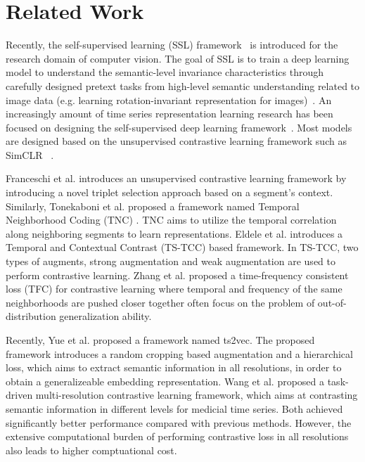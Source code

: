 \section{Related Work}
Recently, the self-supervised learning (SSL) framework~\cite{zhai2019s4l,misra2020self,hendrycks2019using,chen2020simple,he2020momentum,chen2020improved,grill2020bootstrap} is introduced for the research domain of computer vision. The goal of SSL is to train a deep learning model to understand the semantic-level invariance characteristics through carefully designed pretext tasks from  high-level semantic understanding related to image data (e.g. learning rotation-invariant representation for images)~\cite{zhai2019s4l,jang2018grasp2vec,gidaris2018unsupervised}. An increasingly amount of time series representation learning research has been focused on designing the self-supervised deep learning framework~\cite{yue2022ts2vec,franceschi2019unsupervised,tonekaboni2021unsupervised,eldele2021time}. Most models are designed based on the unsupervised contrastive learning framework such as SimCLR ~\cite{chen2020simple}. 

Franceschi et al.\cite{franceschi2019unsupervised} introduces an unsupervised contrastive learning framework by introducing a novel triplet selection approach based on a segment's context. Similarly, Tonekaboni et al. proposed a framework named Temporal Neighborhood Coding (TNC) \cite{tonekaboni2021unsupervised}. TNC aims to utilize the temporal correlation along neighboring segments to learn representations. Eldele et al. \cite{eldele2021time} introduces a Temporal and Contextual Contrast (TS-TCC) based framework.  In TS-TCC, two types of augments, strong augmentation and weak augmentation are used to perform contrastive learning. Zhang et al. \cite{zhang2022self} proposed a time-frequency consistent loss (TFC) for contrastive learning where temporal and frequency of the same neighborhoods are pushed closer together often focus on the problem of out-of-distribution generalization ability. 

Recently, Yue et al. \cite{yue2022ts2vec} proposed a framework named ts2vec. The proposed framework introduces a random cropping based augmentation and a hierarchical loss, which aims to extract semantic information in all resolutions, in order to obtain a generalizeable embedding representation. Wang et al.\cite{wang2024contrast} proposed a task-driven multi-resolution contrastive learning framework, which aims at contrasting semantic information in different levels for medicial time series.  Both achieved significantly better performance compared with previous methods. However, the extensive computational burden of performing contrastive loss in all resolutions also leads to higher comptuational cost.